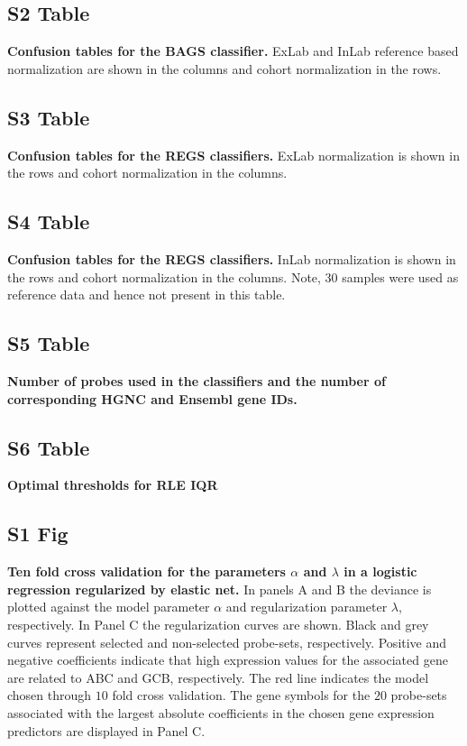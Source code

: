 \documentclass[10pt,letterpaper]{article}
\begin{document}
\subsection*{S2 Table}\label{tab:BAGShemaclass}
\textbf{Confusion tables for the BAGS classifier.} ExLab and InLab reference
based normalization are shown in the columns and cohort normalization in the
rows.

\subsection*{S3 Table}\label{tab:confusiondrugonebyone}
\textbf{Confusion tables for the REGS classifiers.}
ExLab normalization is shown in the rows and cohort normalization in the
columns.

\subsection*{S4 Table}\label{tab:confusiondrugreference}
\textbf{Confusion tables for the REGS classifiers.}
InLab normalization is shown in the rows and cohort normalization in
the columns. Note, 30 samples were used as reference data and hence not present
in this table.

\subsection*{S5 Table}\label{probeTable}
\textbf{Number of probes used in the classifiers and the number of corresponding HGNC and Ensembl gene IDs.}

\subsection*{S6 Table}\label{rleTable}
\textbf{Optimal thresholds for RLE IQR}



\subsection*{S1 Fig}
\label{fig:crossval}
\textbf{Ten fold cross validation for the parameters $\alpha$ and $\lambda$ in a logistic regression regularized by elastic net.}
In panels A and B the deviance is plotted against the model parameter $\alpha$ and regularization parameter $\lambda$, respectively.
In Panel C the regularization curves are shown.
Black and grey curves represent selected and non-selected probe-sets, respectively.
Positive and negative coefficients indicate that high expression values for the associated gene are related to ABC and GCB, respectively.
The red line indicates the model chosen through $10$ fold cross validation.
The gene symbols for the $20$ probe-sets associated with the largest absolute coefficients in the chosen gene expression predictors are displayed in Panel C.
\end{document}
